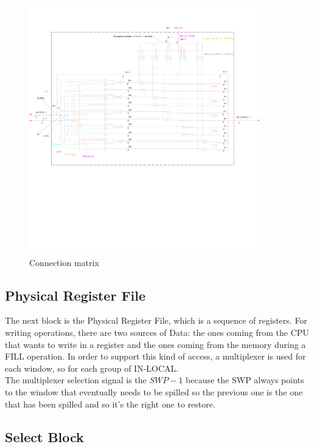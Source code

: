 \begin{figure}[H]
  \centering
  \includegraphics[width=0.9\textwidth]{chapters/4_DecodeStage/images/connection_matrix.pdf}
  \caption{Connection matrix}
  \label{connection_matrix}
\end{figure}

\subsection{Physical Register File}

The next block is the Physical Register File, which is a sequence of registers. For writing operations, there are two sources of Data: the ones coming from the CPU that wants to write in a register and the ones coming from the memory during a FILL operation. In order to support this kind of access, a multiplexer is used for each window, so for each group of IN-LOCAL.\\

The multiplexer selection signal is the $SWP-1$ because the SWP always points to the window that eventually needs to be spilled so the previous one is the one that has been spilled and so it's the right one to restore.

\subsection{Select Block}

